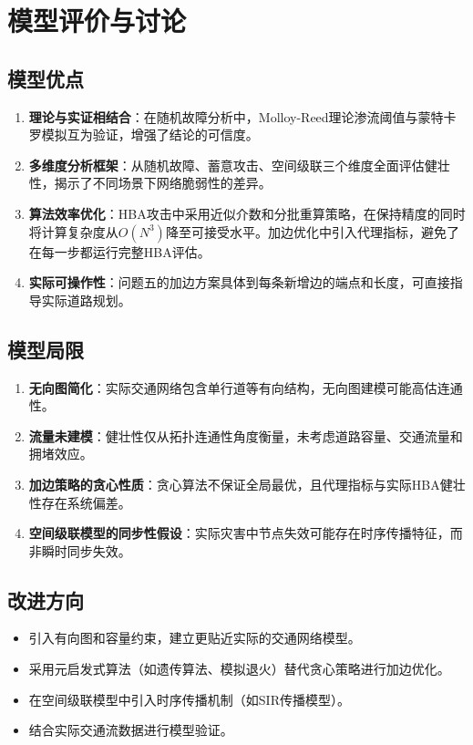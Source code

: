 \documentclass[12pt,a4paper]{article}
\begin{document}
\section{模型评价与讨论}

\subsection{模型优点}

\begin{enumerate}[leftmargin=2em]
    \item \textbf{理论与实证相结合}：在随机故障分析中，Molloy-Reed理论渗流阈值与蒙特卡罗模拟互为验证，增强了结论的可信度。
    \item \textbf{多维度分析框架}：从随机故障、蓄意攻击、空间级联三个维度全面评估健壮性，揭示了不同场景下网络脆弱性的差异。
    \item \textbf{算法效率优化}：HBA攻击中采用近似介数和分批重算策略，在保持精度的同时将计算复杂度从$O(N^3)$降至可接受水平。加边优化中引入代理指标，避免了在每一步都运行完整HBA评估。
    \item \textbf{实际可操作性}：问题五的加边方案具体到每条新增边的端点和长度，可直接指导实际道路规划。
\end{enumerate}

\subsection{模型局限}

\begin{enumerate}[leftmargin=2em]
    \item \textbf{无向图简化}：实际交通网络包含单行道等有向结构，无向图建模可能高估连通性。
    \item \textbf{流量未建模}：健壮性仅从拓扑连通性角度衡量，未考虑道路容量、交通流量和拥堵效应。
    \item \textbf{加边策略的贪心性质}：贪心算法不保证全局最优，且代理指标与实际HBA健壮性存在系统偏差。
    \item \textbf{空间级联模型的同步性假设}：实际灾害中节点失效可能存在时序传播特征，而非瞬时同步失效。
\end{enumerate}

\subsection{改进方向}

\begin{itemize}[leftmargin=2em]
    \item 引入有向图和容量约束，建立更贴近实际的交通网络模型。
    \item 采用元启发式算法（如遗传算法、模拟退火）替代贪心策略进行加边优化。
    \item 在空间级联模型中引入时序传播机制（如SIR传播模型）。
    \item 结合实际交通流数据进行模型验证。
\end{itemize}
\end{document}
